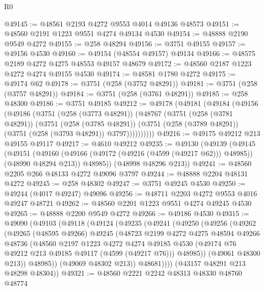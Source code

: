 \begin{lexlean}{R0}
\begin{coremodule}
@49145 := @48561 @2193 @4272 @9553 @4014 @49136 @48573
@49151 := @48560 @2191 @1223 @9551 @4274 @49134 @4530
@49154 := @48888 @2190 @9549 @4272
@49155 := @258 @48294
@49156 := @3751 @49155
@49157 := @49156 @4530
@49160 := @49154 (@48554 @49157) @49134
@49166 := @48575 @2189 @4272 @4275 @48553 @49157 @48679
@49172 := @48560 @2187 @1223 @4272 @4274 @49155 @4530
@49174 := @48581 @1780 @4272
@49175 := @49174 @62
@49178 := @3751 (@258 (@3752 @48291))
@49181 := @3751 (@258 (@3757 @48291))
@49184 := @3751 (@258 (@3761 @48291))
@49185 := @258 @48300
@49186 := @3751 @49185
@49212 := @49178
    (@49181
      (@49184
        (@49156
          (@49186
            (@3751
              (@258 (@3773 @48291))
              (@48767
                (@3751
                  (@258 (@3781 @48291))
                  (@3751
                    (@258 (@3785 @48291))
                    (@3751 (@258 (@3789 @48291)) (@3751 (@258 (@3793 @48291)) @3797))))))))))
@49216 := @49175 @49212 @213 @49155 @49117
@49217 := @4610 @49212
@49235 := @49130
    (@49139
      (@49145
        (@49151
          (@49160 (@49166 (@49172 (@49216 (@4599 (@49217 @62))) @48985)) (@48990 @48294 @213))
          @48985))
      (@48998 @48296 @213))
@49241 := @48560 @2205 @266 @48133 @4272 @49096 @3797
@49244 := @48888 @2204 @48131 @4272
@49245 := @258 @48302
@49247 := @3751 @49245 @4530
@49250 := @49244 (@4017 @49247) @49096
@49256 := @48711 @2203 @4272 @9553 @4016 @49247 @48721
@49262 := @48560 @2201 @1223 @9551 @4274 @49245 @4530
@49265 := @48888 @2200 @9549 @4272
@49266 := @49186 @4530
@49315 := @49090
    (@49103
      (@49118
        (@49124
          (@49235
            (@49241
              (@49250
                (@49256
                  (@49262
                    (@49265
                      (@48595 @49266)
                      @49245
                      (@48723
                        @2199
                        @4272
                        @4275
                        @48594
                        @49266
                        @48736
                        (@48560
                          @2197
                          @1223
                          @4272
                          @4274
                          @49185
                          @4530
                          (@49174 @76 @49212 @213 @49185 @49117 (@4599 (@49217 @76)))
                          @48985))
                      (@49061 @48300 @213))
                    @48985))
                (@49069 @48302 @213))
              @48681))))
      (@43157 @48291 @213 @48298 @48304))
@49321 := @48560 @2221 @2242 @48313 @48330 @48760 @48774

\end{coremodule}
\end{lexlean}
